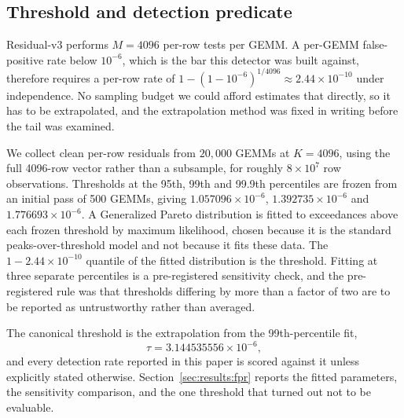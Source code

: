 \subsection{Threshold and detection predicate}
\label{sec:method:threshold}

Residual-v3 performs $M = 4096$ per-row tests per GEMM. A per-GEMM
false-positive rate below $10^{-6}$, which is the bar this detector was built
against, therefore requires a per-row rate of
$1 - (1 - 10^{-6})^{1/4096} \approx 2.44 \times 10^{-10}$ under independence.
No sampling budget we could afford estimates that directly, so it has to be
extrapolated, and the extrapolation method was fixed in writing before the tail
was examined.

We collect clean per-row residuals from $20{,}000$ GEMMs at $K = 4096$, using
the full 4096-row vector rather than a subsample, for roughly
$8 \times 10^{7}$ row observations. Thresholds at the 95th, 99th and 99.9th
percentiles are frozen from an initial pass of 500 GEMMs, giving
$1.057096 \times 10^{-6}$, $1.392735 \times 10^{-6}$ and
$1.776693 \times 10^{-6}$. A Generalized Pareto distribution is fitted to
exceedances above each frozen threshold by maximum likelihood, chosen because
it is the standard peaks-over-threshold model and not because it fits these
data. The $1 - 2.44 \times 10^{-10}$ quantile of the fitted distribution is the
threshold. Fitting at three separate percentiles is a pre-registered
sensitivity check, and the pre-registered rule was that thresholds differing by
more than a factor of two are to be reported as untrustworthy rather than
averaged.

The canonical threshold is the extrapolation from the 99th-percentile fit,
%
\begin{equation}
\tau = 3.144535556 \times 10^{-6},
\end{equation}
%
and every detection rate reported in this paper is scored against it unless
explicitly stated otherwise. Section~\ref{sec:results:fpr} reports the fitted
parameters, the sensitivity comparison, and the one threshold that turned out
not to be evaluable.

